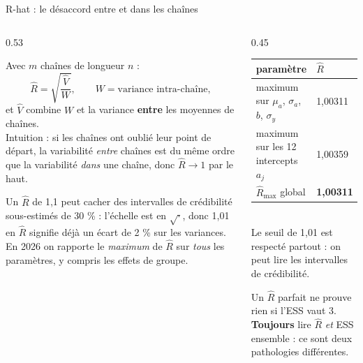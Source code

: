 \begin{frame}{R-hat : le désaccord entre et dans les chaînes}
\footnotesize
\begin{columns}[t]
\begin{column}{0.53\textwidth}
\begin{ebox}
Avec $m$ chaînes de longueur $n$ :
\[
\hat R = \sqrt{\frac{\hat V}{W}}, \qquad
W = \text{variance intra-chaîne},
\]
et $\hat V$ combine $W$ et la variance \textbf{entre} les moyennes de chaînes.
\\[1mm]
Intuition : si les chaînes ont oublié leur point de départ, la variabilité
\emph{entre} chaînes est du même ordre que la variabilité \emph{dans} une chaîne,
donc $\hat R \to 1$ par le haut.
\end{ebox}
\begin{kbox}
Un $\hat R$ de 1,1 peut cacher des intervalles de crédibilité sous-estimés de
30 \% : l'échelle est en $\sqrt{\cdot}$, donc 1,01 en $\hat R$ signifie déjà un
écart de 2 \% sur les variances. En 2026 on rapporte le \emph{maximum} de
$\hat R$ sur \emph{tous} les paramètres, y compris les effets de groupe.
\end{kbox}
\end{column}
\begin{column}{0.45\textwidth}
\begin{solbox}
\footnotesize\begin{tabular}{@{}p{4.3cm}p{1.6cm}@{}}
\toprule
paramètre & $\hat R$ \\
\midrule
maximum sur $\mu_a$, $\sigma_a$, $b$, $\sigma_y$ & 1,00311 \\
maximum sur les 12 intercepts $a_j$ & 1,00359 \\
\midrule
$\hat R_{\max}$ global & \textbf{1,00311} \\
\bottomrule
\end{tabular}
\vspace{1.5mm}
\\ Le seuil de 1,01 est respecté partout : on peut lire les intervalles de crédibilité.
\end{solbox}
\begin{wbox}
Un $\hat R$ parfait ne prouve rien si l'ESS vaut 3. \;\textbf{Toujours} lire
$\hat R$ \emph{et} ESS ensemble : ce sont deux pathologies différentes.
\end{wbox}
\end{column}
\end{columns}
\end{frame}

